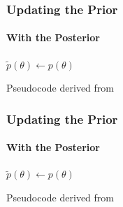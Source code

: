 \documentclass[9pt, aspectratio=169]{beamer}
\begin{document}
\begin{frame}
\frametitle{Updating the Prior}
\framesubtitle{With the Posterior}
\begin{algorithm}[H]
	$\tilde{p}(\theta) \leftarrow p(\theta)$\\
\end{algorithm}
\vspace{35pt}
\tiny Pseudocode derived from \cite{papamakarios2016fast}
\end{frame} 
\begin{frame}
\frametitle{Updating the Prior}
\framesubtitle{With the Posterior}
\begin{algorithm}[H]
	$\tilde{p}(\theta) \leftarrow p(\theta)$\\
\end{algorithm}
\vspace{35pt}
\tiny Pseudocode derived from \cite{papamakarios2016fast}
\end{frame} 
\end{document}
